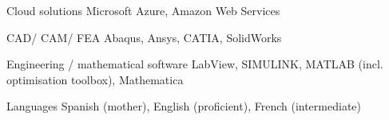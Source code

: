 \begin{cvskills}

\cvskill
{Cloud solutions } %
{Microsoft Azure, Amazon Web Services } %



\cvskill
{CAD/ CAM/ FEA} %
{Abaqus, Ansys, CATIA, SolidWorks } %


\cvskill
{Engineering / mathematical software } %
{LabView, SIMULINK, MATLAB (incl. optimisation toolbox), Mathematica } %


\cvskill
{Languages} %
{Spanish (mother), English (proficient), French (intermediate)} %


\end{cvskills}